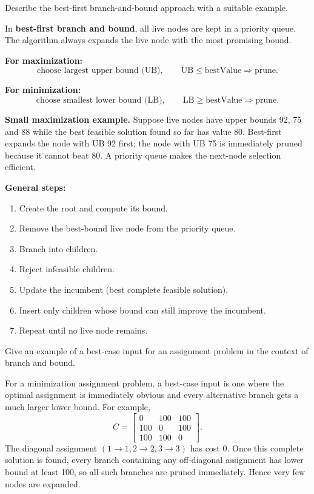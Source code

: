 \documentclass[11pt,a4paper]{article}
\newcommand{\UB}{\mathrm{UB}}
\newcommand{\LB}{\mathrm{LB}}
\begin{document}
\begin{qaquestion}
Describe the best-first branch-and-bound approach with a suitable example.
\end{qaquestion}
\begin{qaanswer}[Answer 3(a)]
In \textbf{best-first branch and bound}, all live nodes are kept in a priority queue. The algorithm always expands the live node with the most promising bound.

\textbf{For maximization:}
\[
\text{choose largest upper bound (UB)},\qquad
\UB\le \text{bestValue}\Rightarrow\text{prune}.
\]

\textbf{For minimization:}
\[
\text{choose smallest lower bound (LB)},\qquad
\LB\ge \text{bestValue}\Rightarrow\text{prune}.
\]

\textbf{Small maximization example.} Suppose live nodes have upper bounds 92, 75 and 88 while the best feasible solution found so far has value 80. Best-first expands the node with UB 92 first; the node with UB 75 is immediately pruned because it cannot beat 80. A priority queue makes the next-node selection efficient.

\textbf{General steps:}
\begin{enumerate}[leftmargin=*]
\item Create the root and compute its bound.
\item Remove the best-bound live node from the priority queue.
\item Branch into children.
\item Reject infeasible children.
\item Update the incumbent (best complete feasible solution).
\item Insert only children whose bound can still improve the incumbent.
\item Repeat until no live node remains.
\end{enumerate}
\end{qaanswer}

\begin{qaquestion}
Give an example of a best-case input for an assignment problem in the context of branch and bound.
\end{qaquestion}
\begin{qaanswer}[Answer 3(b)]
For a minimization assignment problem, a best-case input is one where the optimal assignment is immediately obvious and every alternative branch gets a much larger lower bound. For example,
\[
C=\begin{bmatrix}
0&100&100\\
100&0&100\\
100&100&0
\end{bmatrix}.
\]
The diagonal assignment \((1\to1,2\to2,3\to3)\) has cost 0. Once this complete solution is found, every branch containing any off-diagonal assignment has lower bound at least 100, so all such branches are pruned immediately. Hence very few nodes are expanded.
\end{qaanswer}
\end{document}
